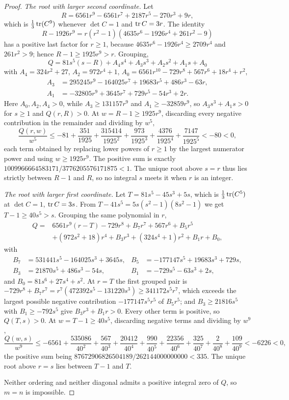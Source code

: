 \begin{proof}
\smallskip\noindent\emph{The root with larger second coordinate.}
Let
$$
 R=6561r^9-6561r^7+2187r^5-270r^3+9r,
$$
which is $\tfrac13\operatorname{tr}(C^9)$ whenever $\det C=1$ and $\operatorname{tr} C=3r$. The
identity
$$
 R-1926r^9=r(r^2-1)(4635r^6-1926r^4+261r^2-9)
$$
has a positive last factor for $r\geqslant1$, because
$4635r^6-1926r^4\geqslant2709r^4$ and $261r^2>9$; hence
$R-1\geqslant1925r^9>r$. Grouping,
$$
 Q=81s^5(s-R)+A_4s^4+A_3s^3+A_2s^2+A_1s+A_0
$$
with $A_4=324r^2+27$, $A_2=972r^4+1$,
$A_0=6561r^{10}-729r^8+567r^6+18r^4+r^2$,
$$
\begin{aligned}
 A_3&=295245r^9-164025r^7+19683r^5+486r^3-63r,\\
 A_1&=-32805r^9+3645r^7+729r^5-54r^3+2r .
\end{aligned}
$$
Here $A_0,A_2,A_4>0$, while $A_3\geqslant131157r^9$ and
$A_1\geqslant-32859r^9$, so $A_3s^3+A_1s>0$ for $s\geqslant1$ and
$Q(r,R)>0$. At $w=R-1\geqslant1925r^9$, discarding every negative
contribution in the remainder and dividing by $w^5$,
$$
 \frac{Q(r,w)}{w^5}\leqslant-81+\frac{351}{1925}+\frac{315414}{1925^2}
 +\frac{973}{1925^3}+\frac{4376}{1925^4}+\frac{7147}{1925^5}<-80<0,
$$
each term obtained by replacing lower powers of $r\geqslant1$ by the
largest numerator power and using $w\geqslant1925r^9$. The positive sum is
exactly $1009966664583171/3776205576171875<1$. The unique root above
$s=r$ thus lies strictly between $R-1$ and $R$, so no integral $s$ meets
it when $r$ is an integer.

\smallskip\noindent\emph{The root with larger first coordinate.}
Let $T=81s^5-45s^3+5s$, which is $\tfrac13\operatorname{tr}(C^5)$ at $\det C=1$,
$\operatorname{tr} C=3s$. From $T-41s^5=5s(s^2-1)(8s^2-1)$ we get
$T-1\geqslant40s^5>s$. Grouping the same polynomial in $r$,
$$
\begin{aligned}
 Q={}&6561r^9(r-T)-729r^8+B_7r^7+567r^6+B_5r^5\\
 &+(972s^2+18)r^4+B_3r^3+(324s^4+1)r^2+B_1r+B_0,
\end{aligned}
$$
with
$$
\begin{aligned}
 B_7&=531441s^5-164025s^3+3645s, &
 B_5&=-177147s^5+19683s^3+729s,\\
 B_3&=21870s^5+486s^3-54s, &
 B_1&=-729s^5-63s^3+2s,
\end{aligned}
$$
and $B_0=81s^6+27s^4+s^2$. At $r=T$ the first grouped pair is
$-729r^8+B_7r^7=r^7(472392s^5-131220s^3)\geqslant341172s^5r^7$, which
exceeds the largest possible negative contribution $-177147s^5r^5$ of
$B_5r^5$; and $B_3\geqslant21816s^5$ with $B_1\geqslant-792s^5$ give
$B_3r^3+B_1r>0$. Every other term is positive, so $Q(T,s)>0$. At
$w=T-1\geqslant40s^5$, discarding negative terms and dividing by $w^9$,
$$
 \frac{Q(w,s)}{w^9}\leqslant-6561+\frac{535086}{40^2}+\frac{567}{40^3}
 +\frac{20412}{40^4}+\frac{990}{40^5}+\frac{22356}{40^6}
 +\frac{325}{40^7}+\frac2{40^8}+\frac{109}{40^9}<-6226<0,
$$
the positive sum being $87672906826504189/262144000000000<335$. The unique
root above $r=s$ lies between $T-1$ and $T$.

Neither ordering and neither diagonal admits a positive integral zero of
$Q$, so $m=n$ is impossible.
\end{proof}

